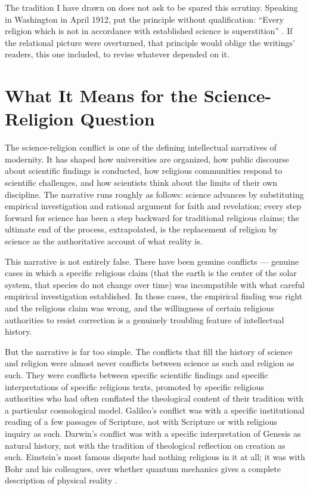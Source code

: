 The tradition I have drawn on does not ask to be spared this scrutiny.
Speaking in Washington in April 1912, \AbdulBaha put the principle without
qualification: ``Every religion which is not in accordance with established
science is superstition'' \citep[Talk 26]{PUP}.  If the relational picture
were overturned, that principle would oblige the writings' readers, this one
included, to revise whatever depended on it.


\section{What It Means for the Science-Religion Question}
\label{sec:ch15-science-religion}

The science-religion conflict is one of the defining intellectual narratives of
modernity.  It has shaped how universities are organized, how public discourse
about scientific findings is conducted, how religious communities respond to
scientific challenges, and how scientists think about the limits of their own
discipline.  The narrative runs roughly as follows: science advances by
substituting empirical investigation and rational argument for faith and
revelation; every step forward for science has been a step backward for
traditional religious claims; the ultimate end of the process, extrapolated,
is the replacement of religion by science as the authoritative account of
what reality is.

This narrative is not entirely false.  There have been genuine conflicts ---
genuine cases in which a specific religious claim (that the earth is the center
of the solar system, that species do not change over time) was incompatible with
what careful empirical investigation established.  In those cases, the empirical
finding was right and the religious claim was wrong, and the willingness of
certain religious authorities to resist correction is a genuinely troubling
feature of intellectual history.

But the narrative is far too simple.  The conflicts that fill the history of
science and religion were almost never conflicts between science as such and
religion as such.  They were conflicts between specific scientific findings and
specific interpretations of specific religious texts, promoted by specific
religious authorities who had often conflated the theological content of their
tradition with a particular cosmological model.  Galileo's conflict was with a
specific institutional reading of a few passages of Scripture, not with Scripture
or with religious inquiry as such.  Darwin's conflict was with a specific
interpretation of Genesis as natural history, not with the tradition of theological
reflection on creation as such.  Einstein's most famous dispute had nothing
religious in it at all; it was with Bohr and his colleagues, over whether
quantum mechanics gives a complete description of physical reality
\citep{Einstein1935EPR}.

